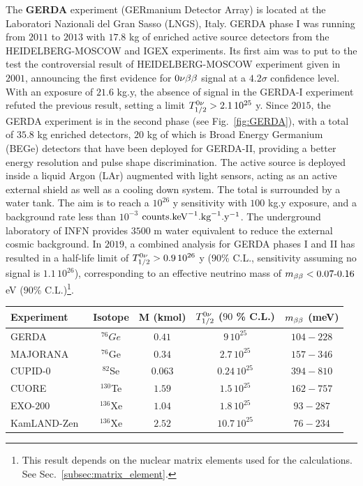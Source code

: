 The \textbf{GERDA} experiment (GERmanium Detector Array) is located at the Laboratori Nazionali del Gran Sasso (LNGS), Italy.
GERDA phase I was running from $2011$ to $2013$ with $17.8$ kg of enriched active source detectors from the HEIDELBERG-MOSCOW and IGEX experiments.
Its first aim was to put to the test the controversial result of HEIDELBERG-MOSCOW experiment given in $2001$, announcing the first evidence for $0\nu\beta\beta$ signal at a $4.2\sigma$ confidence level.
With an exposure of $21.6$ kg.y, the absence of signal in the GERDA-I experiment refuted the previous result, setting a limit $T_{1/2}^{0\nu}>2.1\, 10^{25}$ y.
Since $2015$, the GERDA experiment is in the second phase (see Fig.~\ref{fig:GERDA}), with a total of $35.8$ kg enriched detectors, $20$ kg of which is Broad Energy Germanium (BEGe) detectors that have been deployed for GERDA-II, providing a better energy resolution and pulse shape discrimination.
The active source is deployed inside a liquid Argon (LAr) augmented with light sensors, acting as an active external shield as well as a cooling down system.
The total is surrounded by a water tank.
The aim is to reach a $10^{26}$ y sensitivity with $100$ kg.y exposure, and a background rate less than $10^{-3}$ $\text{counts.keV}^{-1}\text{.kg}^{-1}\text{.y}^{-1}$.
The underground laboratory of INFN provides $3500$ m water equivalent to reduce the external cosmic background.
In $2019$, a combined analysis for GERDA phases I and II has resulted in a half-life limit of $T_{1/2}^{0\nu}>0.9\, 10^{26}$ y ($90$\% C.L., sensitivity assuming no signal is $1.1\, 10^{26}$), corresponding to an effective neutrino mass of $m_{\beta\beta}<0.07\text{-}0.16$ eV ($90$\% C.L.)\footnote{This result depends on the nuclear matrix elements used for the calculations. See Sec.~\ref{subsec:matrix_element}.}.


\begin{center}
  \begin{table}
    \begin{tabular}{l  c  c  c  c}
      \hline \hline
      Experiment &  Isotope  & M (kmol)&$T_{1/2}^{0\nu}$ ($90$ \% C.L.)&  $m_{\beta\beta}$ (meV)\\
      \hline
      GERDA~\cite{art:GERDA2019}        & $^{76}Ge$  & $0.41$  & $9\,10^{25}$          & $104-228$    \\
      MAJORANA~\cite{art:majorana2019}  & $^{76}$Ge  & $0.34$  & $2.7\,10^{25}$        & $157-346$    \\
      CUPID-$0$~\cite{art:CUPID2018}    & $^{82}$Se  & $0.063$ & $0.24\,10^{25}$       & $394-810$    \\
      CUORE~\cite{art:CUORE2018}        & $^{130}$Te & $1.59$  & $1.5\,10^{25}$        & $162-757$    \\
      EXO-$200$~\cite{art:EXO2018}      & $^{136}$Xe & $1.04$  & $1.8\,10^{25}$        & $93-287$     \\
      KamLAND-Zen~\cite{art:KamLAND2016}& $^{136}$Xe & $2.52$  & $10.7\,10^{25}$       & $76-234$     \\
      \hline \hline
    \end{tabular}
  \end{table}
\end{center}



